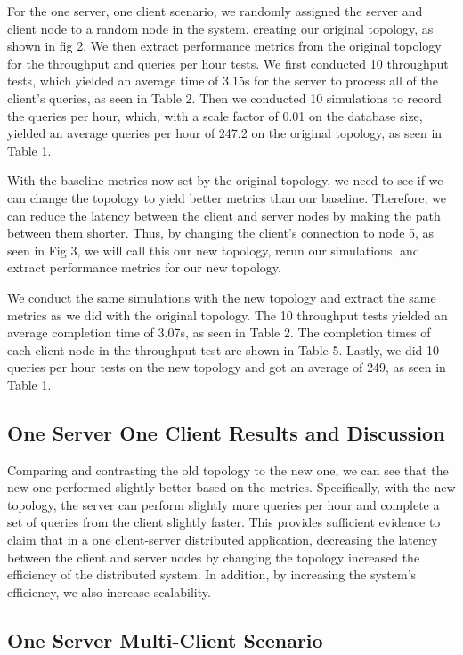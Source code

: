 For the one server, one client scenario, we randomly assigned the server and client node to a random node in the system, creating our original topology, as shown in fig 2. We then extract performance metrics from the original topology for the throughput and queries per hour tests. We first conducted 10 throughput tests, which yielded an average time of 3.15s for the server to process all of the client's queries, as seen in Table 2. Then we conducted 10 simulations to record the queries per hour, which, with a scale factor of 0.01 on the database size, yielded an average queries per hour of 247.2 on the original topology, as seen in Table 1.

	With the baseline metrics now set by the original topology, we need to see if we can change the topology to yield better metrics than our baseline. Therefore, we can reduce the latency between the client and server nodes by making the path between them shorter. Thus, by changing the client's connection to node 5, as seen in Fig 3, we will call this our new topology, rerun our simulations, and extract performance metrics for our new topology.

	We conduct the same simulations with the new topology and extract the same metrics as we did with the original topology. The 10 throughput tests yielded an average completion time of 3.07s, as seen in Table 2. The completion times of each client node in the throughput test are shown in Table 5. Lastly, we did 10 queries per hour tests on the new topology and got an average of 249, as seen in Table 1.


\subsection{One Server One Client Results and Discussion}

	Comparing and contrasting the old topology to the new one, we can see that the new one performed slightly better based on the metrics. Specifically, with the new topology, the server can perform slightly more queries per hour and complete a set of queries from the client slightly faster. This provides sufficient evidence to claim that in a one client-server distributed application, decreasing the latency between the client and server nodes by changing the topology increased the efficiency of the distributed system. In addition, by increasing the system's efficiency, we also increase scalability.



\subsection{One Server Multi-Client Scenario}

